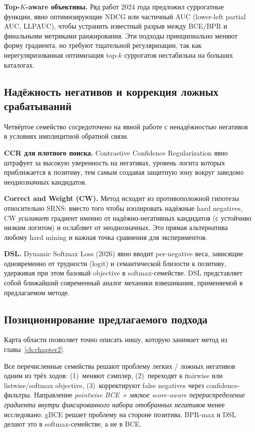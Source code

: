 \textbf{Top-$K$-aware объективы.} Ряд работ 2024 года предложил суррогатные функции, явно
оптимизирующие NDCG или частичный AUC (lower-left partial AUC, LLPAUC), чтобы устранить
известный разрыв между BCE/BPR и финальными метриками ранжирования. Эти подходы принципиально
меняют форму градиента, но требуют тщательной регуляризации, так как нерегуляризованная оптимизация
top-$k$ суррогатов нестабильна на больших каталогах.

\subsection{Надёжность негативов и коррекция ложных срабатываний}
\label{subsec:ch1:false_neg_correction}

Четвёртое семейство сосредоточено на явной работе с ненадёжностью негативов в условиях
имплицитной обратной связи.

\textbf{CCR для плотного поиска.} Contrastive Confidence Regularization явно штрафует за высокую
уверенность на негативах, уровень логита которых приближается к позитиву, тем самым создавая
защитную зону вокруг заведомо неоднозначных кандидатов.

\textbf{Correct and Weight (CW).} Метод исходит из противоположной гипотезы относительно SRNS:
вместо того чтобы изолировать надёжные hard negatives, CW \emph{усиливает} градиент именно от
надёжно-негативных кандидатов (с устойчиво низким логитом) и ослабляет от неоднозначных. Это
прямая альтернатива любому hard mining и важная точка сравнения для экспериментов.

\textbf{DSL.} Dynamic Softmax Loss (2026) явно вводит per-negative веса, зависящие одновременно от
трудности (logit) и семантической близости к позитиву, удерживая при этом базовый objective в
softmax-семействе. DSL представляет собой ближайший современный аналог механики взвешивания,
применяемой в предлагаемом методе.

\subsection{Позиционирование предлагаемого подхода}
\label{subsec:ch1:neg_gap}

Карта области позволяет точно описать нишу, которую занимает метод из главы~\ref{ch:chapter2}.

Все перечисленные семейства решают проблему легких / ложных негативов одним из трёх ходов:
(1)~меняют сэмплер, (2)~переходят к пairwise или listwise/softmax objective, (3)~корректируют
false negatives через confidence-фильтры. Направление \emph{pointwise BCE + мягкое
score-aware перераспределение градиента внутри фиксированного набора отобранных негативов}
менее исследовано: gBCE решает проблему на стороне позитива, BPR-max и DSL делают это в
softmax-семействе, а не в BCE.

